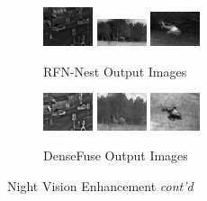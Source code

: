 \begin{figure}[htbp]
\begin{subfigure}[b]{\textwidth}
        \includegraphics[width=0.16\textwidth, height=0.1\textheight]{imgs/ch5/rfn/02.png}
        \includegraphics[width=0.16\textwidth, height=0.1\textheight]{imgs/ch5/rfn/07.png}
        \includegraphics[width=0.16\textwidth, height=0.1\textheight]{imgs/ch5/rfn/11.png}
        \captionsetup{justification=raggedright,singlelinecheck=false}
        \caption{RFN-Nest\cite{li2021rfn} Output Images}
        \label{fig:ch5:met4:rfn}
    \end{subfigure}
    \vspace{0.01cm}
    \begin{subfigure}[b]{\textwidth}
        \includegraphics[width=0.16\textwidth, height=0.1\textheight]{imgs/ch5/denseFuse/02.png}
        \includegraphics[width=0.16\textwidth, height=0.1\textheight]{imgs/ch5/denseFuse/07.png}
        \includegraphics[width=0.16\textwidth, height=0.1\textheight]{imgs/ch5/denseFuse/11.png}
        \captionsetup{justification=raggedright,singlelinecheck=false}
        \caption{DenseFuse\cite{li2019infrared} Output Images}
        \label{fig:ch5:met4:densefuse}
    \end{subfigure}
    \captionsetup{justification=raggedright,singlelinecheck=false}
        \caption{Night Vision Enhancement \textit{cont'd}}
\end{figure}

